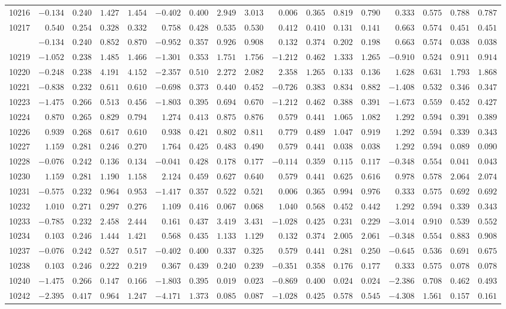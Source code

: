 \documentclass[6pt]{article}
\begin{document}
\begin{landscape}
{\begin{longtable}{lrrrrrrrrrrrrrrrr}
10216&$-0.134$&$0.240$&$1.427$&$1.454$&$-0.402$&$0.400$&$2.949$&$3.013$&$ 0.006$&$0.365$&$0.819$&$0.790$&$ 0.333$&$0.575$&$0.788$&$0.787$\tabularnewline
10217&$ 0.540$&$0.254$&$0.328$&$0.332$&$ 0.758$&$0.428$&$0.535$&$0.530$&$ 0.412$&$0.410$&$0.131$&$0.141$&$ 0.663$&$0.574$&$0.451$&$0.451$\tabularnewline
\newpage
10218&$-0.134$&$0.240$&$0.852$&$0.870$&$-0.952$&$0.357$&$0.926$&$0.908$&$ 0.132$&$0.374$&$0.202$&$0.198$&$ 0.663$&$0.574$&$0.038$&$0.038$\tabularnewline
10219&$-1.052$&$0.238$&$1.485$&$1.466$&$-1.301$&$0.353$&$1.751$&$1.756$&$-1.212$&$0.462$&$1.333$&$1.265$&$-0.910$&$0.524$&$0.911$&$0.914$\tabularnewline
10220&$-0.248$&$0.238$&$4.191$&$4.152$&$-2.357$&$0.510$&$2.272$&$2.082$&$ 2.358$&$1.265$&$0.133$&$0.136$&$ 1.628$&$0.631$&$1.793$&$1.868$\tabularnewline
10221&$-0.838$&$0.232$&$0.611$&$0.610$&$-0.698$&$0.373$&$0.440$&$0.452$&$-0.726$&$0.383$&$0.834$&$0.882$&$-1.408$&$0.532$&$0.346$&$0.347$\tabularnewline
10223&$-1.475$&$0.266$&$0.513$&$0.456$&$-1.803$&$0.395$&$0.694$&$0.670$&$-1.212$&$0.462$&$0.388$&$0.391$&$-1.673$&$0.559$&$0.452$&$0.427$\tabularnewline
10224&$ 0.870$&$0.265$&$0.829$&$0.794$&$ 1.274$&$0.413$&$0.875$&$0.876$&$ 0.579$&$0.441$&$1.065$&$1.082$&$ 1.292$&$0.594$&$0.391$&$0.389$\tabularnewline
10226&$ 0.939$&$0.268$&$0.617$&$0.610$&$ 0.938$&$0.421$&$0.802$&$0.811$&$ 0.779$&$0.489$&$1.047$&$0.919$&$ 1.292$&$0.594$&$0.339$&$0.343$\tabularnewline
10227&$ 1.159$&$0.281$&$0.246$&$0.270$&$ 1.764$&$0.425$&$0.483$&$0.490$&$ 0.579$&$0.441$&$0.038$&$0.038$&$ 1.292$&$0.594$&$0.089$&$0.090$\tabularnewline
10228&$-0.076$&$0.242$&$0.136$&$0.134$&$-0.041$&$0.428$&$0.178$&$0.177$&$-0.114$&$0.359$&$0.115$&$0.117$&$-0.348$&$0.554$&$0.041$&$0.043$\tabularnewline
10230&$ 1.159$&$0.281$&$1.190$&$1.158$&$ 2.124$&$0.459$&$0.627$&$0.640$&$ 0.579$&$0.441$&$0.625$&$0.616$&$ 0.978$&$0.578$&$2.064$&$2.074$\tabularnewline
10231&$-0.575$&$0.232$&$0.964$&$0.953$&$-1.417$&$0.357$&$0.522$&$0.521$&$ 0.006$&$0.365$&$0.994$&$0.976$&$ 0.333$&$0.575$&$0.692$&$0.692$\tabularnewline
10232&$ 1.010$&$0.271$&$0.297$&$0.276$&$ 1.109$&$0.416$&$0.067$&$0.068$&$ 1.040$&$0.568$&$0.452$&$0.442$&$ 1.292$&$0.594$&$0.339$&$0.343$\tabularnewline
10233&$-0.785$&$0.232$&$2.458$&$2.444$&$ 0.161$&$0.437$&$3.419$&$3.431$&$-1.028$&$0.425$&$0.231$&$0.229$&$-3.014$&$0.910$&$0.539$&$0.552$\tabularnewline
10234&$ 0.103$&$0.246$&$1.444$&$1.421$&$ 0.568$&$0.435$&$1.133$&$1.129$&$ 0.132$&$0.374$&$2.005$&$2.061$&$-0.348$&$0.554$&$0.883$&$0.908$\tabularnewline
10237&$-0.076$&$0.242$&$0.527$&$0.517$&$-0.402$&$0.400$&$0.337$&$0.325$&$ 0.579$&$0.441$&$0.281$&$0.250$&$-0.645$&$0.536$&$0.691$&$0.675$\tabularnewline
10238&$ 0.103$&$0.246$&$0.222$&$0.219$&$ 0.367$&$0.439$&$0.240$&$0.239$&$-0.351$&$0.358$&$0.176$&$0.177$&$ 0.333$&$0.575$&$0.078$&$0.078$\tabularnewline
10240&$-1.475$&$0.266$&$0.147$&$0.166$&$-1.803$&$0.395$&$0.019$&$0.023$&$-0.869$&$0.400$&$0.024$&$0.024$&$-2.386$&$0.708$&$0.462$&$0.493$\tabularnewline
10242&$-2.395$&$0.417$&$0.964$&$1.247$&$-4.171$&$1.373$&$0.085$&$0.087$&$-1.028$&$0.425$&$0.578$&$0.545$&$-4.308$&$1.561$&$0.157$&$0.161$\tabularnewline
\hline
\end{longtable}}\end{landscape}
\end{document}
